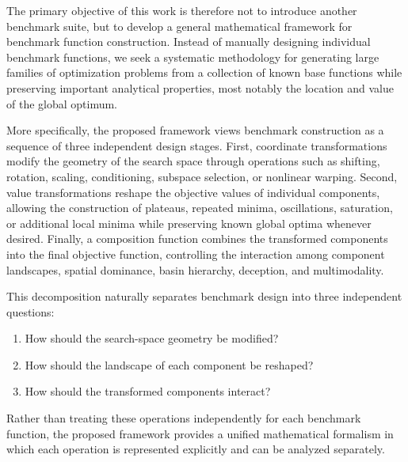 \documentclass[11pt,a4paper]{article}
\theoremstyle{remark}
\theoremstyle{plain}
\begin{document}
The primary objective of this work is therefore not to introduce another
benchmark suite, but to develop a general mathematical framework for benchmark
function construction. Instead of manually designing individual benchmark
functions, we seek a systematic methodology for generating large families of
optimization problems from a collection of known base functions while preserving
important analytical properties, most notably the location and value of the
global optimum.

More specifically, the proposed framework views benchmark construction as a
sequence of three independent design stages. First, coordinate transformations
modify the geometry of the search space through operations such as shifting,
rotation, scaling, conditioning, subspace selection, or nonlinear warping.
Second, value transformations reshape the objective values of individual
components, allowing the construction of plateaus, repeated minima,
oscillations, saturation, or additional local minima while preserving known
global optima whenever desired. Finally, a composition function combines the
transformed components into the final objective function, controlling the
interaction among component landscapes, spatial dominance, basin hierarchy,
deception, and multimodality.

This decomposition naturally separates benchmark design into three independent
questions:
\begin{enumerate}
	\item How should the search-space geometry be modified?
	\item How should the landscape of each component be reshaped?
	\item How should the transformed components interact?
\end{enumerate}
Rather than treating these operations independently for each benchmark
function, the proposed framework provides a unified mathematical formalism in
which each operation is represented explicitly and can be analyzed separately.
\end{document}
